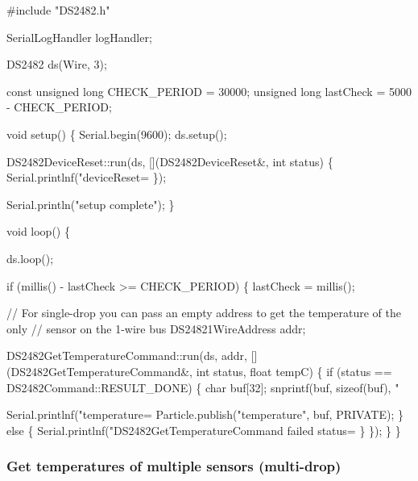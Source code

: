 \begin{DoxyCode}
#include "DS2482.h"

SerialLogHandler logHandler;

DS2482 ds(Wire, 3);

const unsigned long CHECK\_PERIOD = 30000;
unsigned long lastCheck = 5000 - CHECK\_PERIOD;

void setup() \{
    Serial.begin(9600);
    ds.setup();

    DS2482DeviceReset::run(ds, [](DS2482DeviceReset&, int status) \{
        Serial.printlnf("deviceReset=%
    \});

    Serial.println("setup complete");
\}



void loop() \{

    ds.loop();

    if (millis() - lastCheck >= CHECK\_PERIOD) \{
        lastCheck = millis();

        // For single-drop you can pass an empty address to get the temperature of the only
        // sensor on the 1-wire bus
        DS24821WireAddress addr;

        DS2482GetTemperatureCommand::run(ds, addr, [](DS2482GetTemperatureCommand&, int status, float
       tempC) \{
            if (status == DS2482Command::RESULT\_DONE) \{
                char buf[32];
                snprintf(buf, sizeof(buf), "%

                Serial.printlnf("temperature=%
                Particle.publish("temperature", buf, PRIVATE);
            \}
            else \{
                Serial.printlnf("DS2482GetTemperatureCommand failed status=%
            \}
        \});
    \}
\}
\end{DoxyCode}


\subsubsection*{Get temperatures of multiple sensors (multi-\/drop)}



